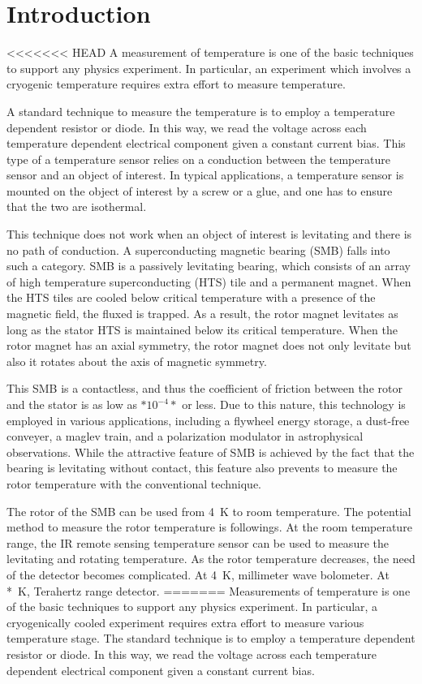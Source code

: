 \section{Introduction}

<<<<<<< HEAD
A measurement of temperature is one of the basic techniques to support any physics experiment. 
In particular, an experiment which involves a cryogenic temperature requires extra effort to measure temperature.

A standard technique to measure the temperature is to employ a temperature dependent resistor or diode. 
In this way, we read the voltage across each temperature dependent electrical component given a constant current bias. 
This type of a temperature sensor relies on a conduction between the temperature sensor and an object of interest. 
In typical applications, a temperature sensor is mounted on the object of interest by a screw or a glue, and one has to ensure that the two are isothermal. 

This technique does not work when an object of interest is levitating and there is no path of conduction. 
A superconducting magnetic bearing (SMB) falls into such a category. 
SMB is a passively levitating bearing, which consists of an array of high temperature superconducting (HTS) tile and a permanent magnet. 
When the HTS tiles are cooled below critical temperature with a presence of the magnetic field, the fluxed is trapped. 
As a result, the rotor magnet levitates as long as the stator HTS is maintained below its critical temperature. 
When the rotor magnet has an axial symmetry, the rotor magnet does not only levitate but also it rotates about the axis of magnetic symmetry. 

This SMB is a contactless, and thus the coefficient of friction between the rotor and the stator is as low as $*10^{-4}*$ or less. 
Due to this nature, this technology is employed in various applications, including a flywheel energy storage, a dust-free conveyer, a maglev train, and a polarization modulator in astrophysical observations.
While the attractive feature of SMB is achieved by the fact that the bearing is levitating without contact, this feature also prevents to measure the rotor temperature with the conventional technique. 

The rotor of the SMB can be used from 4~K to room temperature. 
The potential method to measure the rotor temperature is followings.
At the room temperature range, the IR remote sensing temperature sensor can be used to measure the levitating and rotating temperature. 
As the rotor temperature decreases, the need of the detector becomes complicated. 
At 4~K, millimeter wave bolometer. 
At *~K, Terahertz range detector. 
=======
Measurements of temperature is one of the basic techniques to support any physics experiment.
In particular, a cryogenically cooled experiment requires extra effort to measure various temperature stage.
The standard technique is to employ a temperature dependent resistor or diode.
In this way, we read the voltage across each temperature dependent electrical component given a constant current bias.

